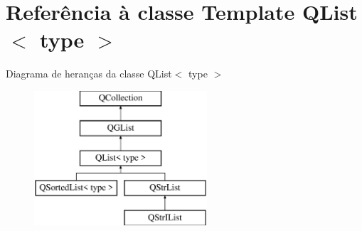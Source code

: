 \hypertarget{class_q_list}{\section{Referência à classe Template Q\-List$<$ type $>$}
\label{class_q_list}
}
Diagrama de heranças da classe Q\-List$<$ type $>$\begin{figure}[H]
\begin{center}
\leavevmode
\includegraphics[height=5.000000cm]{class_q_list}
\end{center}
\end{figure}
